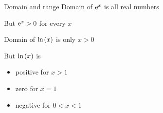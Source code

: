 
\begin{multicols}{2}

 \begin{FormulaBox}{Domain and range}
  Domain of $\mathrm{e}^x$ is all real numbers

  But $\mathrm{e}^x > 0$ for every $x$
  \smallskip

  Domain of $\mathrm{ln}\hspace{-0.1ex}\left(x\right)$ is only $x > 0$

  But $\mathrm{ln}\hspace{-0.1ex}\left(x\right)$ is
  \begin{itemize}
  \item positive for $x > 1$
  \item zero for $x = 1$
  \item negative for $0 < x < 1$
  \end{itemize}


\end{FormulaBox}
\end{multicols}

